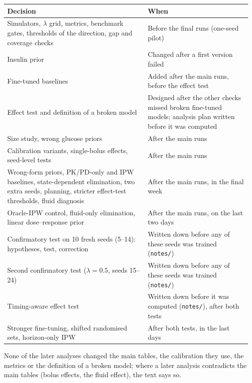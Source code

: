 \documentclass[letterpaper]{article}
\begin{document}
\begin{table}[h]
\centering
\small
\begin{tabular}{p{}p{}}
\toprule
Decision & When \\
\midrule
Simulators, $\lambda$ grid, metrics, benchmark gates, thresholds of the direction, gap and coverage checks & Before the final runs (one-seed pilot) \\
Insulin prior & Changed after a first version failed \\
Fine-tuned baselines & Added after the main runs, before the effect test \\
Effect test and definition of a broken model & Designed after the other checks missed broken fine-tuned models; analysis plan written before it was computed \\
Size study, wrong glucose priors & After the main runs \\
Calibration variants, single-bolus effects, seed-level tests & After the main runs \\
Wrong-form priors, PK/PD-only and IPW baselines, state-dependent elimination, two extra seeds, planning, stricter effect-test thresholds, fluid diagnosis & After the main runs, in the final week \\
Oracle-IPW control, fluid-only elimination, linear dose--response prior & After the main runs, on the last two days \\
Confirmatory test on 10 fresh seeds (5--14): hypotheses, test, correction & Written down before any of these seeds was trained (\texttt{notes/}) \\
Second confirmatory test ($\lambda=0.5$, seeds 15--24) & Written down before any of these seeds was trained (\texttt{notes/}) \\
Timing-aware effect test & Written down before it was computed (\texttt{notes/}), after both tests \\
Stronger fine-tuning, shifted randomised sets, horizon-only IPW & After both tests, in the last days \\
\bottomrule
\end{tabular}
\end{table}

None of the later analyses changed the main tables, the calibration they use, the metrics or the definition of a broken model; where a later analysis contradicts the main tables (bolus effects, the fluid effect), the text says so.
\end{document}
